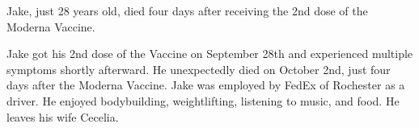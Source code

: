 Jake, just 28 years old, died four days after receiving the 2nd dose of the
Moderna Vaccine.

Jake got his 2nd dose of the Vaccine on September 28th and experienced multiple
symptoms shortly afterward. He unexpectedly died on October 2nd, just four days
after the Moderna Vaccine. Jake was employed by FedEx of Rochester as a
driver. He enjoyed bodybuilding, weightlifting, listening to music, and food. He
leaves his wife Cecelia.


